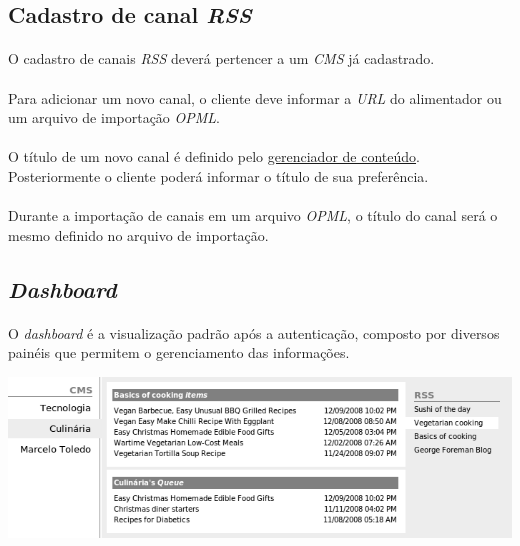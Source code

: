 \documentclass[a4paper,12pt]{article}
\def\cms{\emph{CMS}}
\def\rss{\emph{RSS}}
\def\url{\emph{URL}}
\def\gerenciadorconteudo{\hyperref[gerenciadorconteudo]{gerenciador de conteúdo}}
\begin{document}
\subsection{Cadastro de canal \rss{}}

\paragraph{}
O cadastro de canais \rss{} deverá pertencer a um \cms{} já cadastrado.

\paragraph{}
Para adicionar um novo canal, o cliente deve informar a \url{} do alimentador
ou um arquivo de importação \emph{OPML}.

\paragraph{}
O título de um novo canal é definido pelo \gerenciadorconteudo{}.
Posteriormente o cliente poderá informar o título de sua preferência.

\paragraph{}
Durante a importação de canais em um arquivo \emph{OPML}, o título do canal
será o mesmo definido no arquivo de importação.

\subsection{\emph{Dashboard}}

\paragraph{}
O \emph{dashboard} é a visualização padrão após a autenticação, composto por
diversos painéis que permitem o gerenciamento das informações. 

\begin{center}
\includegraphics[scale=0.5]{dashboard.png}
\end{center}
\end{document}
